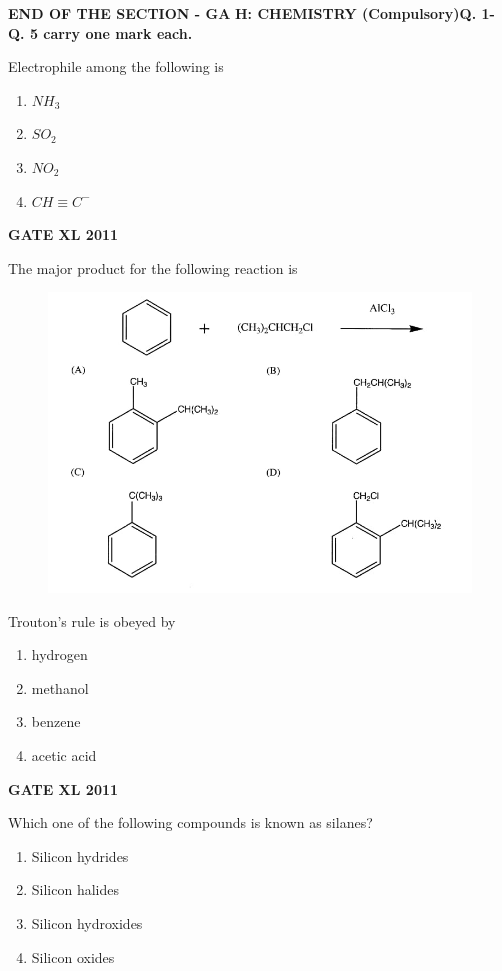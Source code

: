 \documentclass[journal,12pt,onecolumn]{IEEEtran}
\begin{document}
	\textbf{END OF THE SECTION - GA}
\newpage
	\textbf{H: CHEMISTRY (Compulsory)\newline Q. 1- Q. 5 carry one mark each.}
\begin{enumerate}
	\item{ Electrophile among the following is
		\begin{enumerate}
			\item{ $NH_3$}
			\item{ $SO_2$}
			\item{ $NO_2$}
			\item{$CH \equiv C^-$}

		\end{enumerate}\hfill{\textbf{GATE XL 2011}}
	\item{ The major product for the following reaction is}
	
	\begin{figure}[h!]
	\centering
	\includegraphics[width=\textwidth]{2}
	\caption*{}
	\label{fig:Q2}
	\end{figure}
	\item{ Trouton's rule is obeyed by}
		\begin{enumerate}
			\item{ hydrogen}
			\item{methanol}
			\item{benzene}
			\item{ acetic acid}

		\end{enumerate}\hfill{\textbf{GATE XL 2011}}
	\item{ Which one of the following compounds is known as silanes?}
		\begin{enumerate}
			\item{ Silicon hydrides}
			\item{ Silicon halides}
			\item{ Silicon hydroxides}
			\item{ Silicon oxides}


\end{enumerate}}
\end{enumerate}
\end{document}
